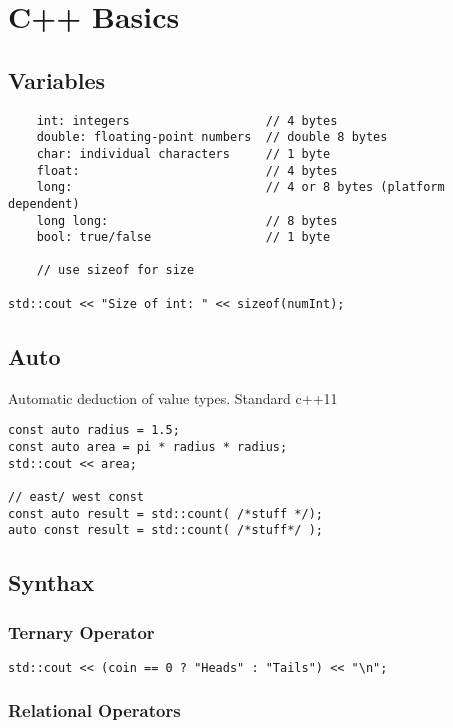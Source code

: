 \chapter{C++ Basics}

\section{Variables}

\begin{verbatim}
    int: integers                   // 4 bytes
    double: floating-point numbers  // double 8 bytes
    char: individual characters     // 1 byte
    float:                          // 4 bytes
    long:                           // 4 or 8 bytes (platform dependent)
    long long:                      // 8 bytes
    bool: true/false                // 1 byte

    // use sizeof for size

std::cout << "Size of int: " << sizeof(numInt); 
\end{verbatim}

\section{Auto}

Automatic deduction of value types. Standard c++11

\begin{verbatim}
const auto radius = 1.5;
const auto area = pi * radius * radius;
std::cout << area;

// east/ west const
const auto result = std::count( /*stuff */);
auto const result = std::count( /*stuff*/ );
\end{verbatim}

\section{Synthax}
\subsection{Ternary Operator}

\begin{verbatim}
std::cout << (coin == 0 ? "Heads" : "Tails") << "\n";
\end{verbatim}

\subsection{Relational Operators}

